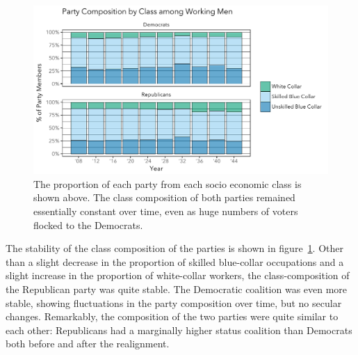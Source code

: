 \documentclass[11pt]{scrartcl}\usepackage[]{graphicx}\usepackage[]{color}
\makeatletter
\def\maxwidth{ %
  \ifdim\Gin@nat@width>\linewidth
    \linewidth
  \else
    \Gin@nat@width
  \fi
}
\newenvironment{knitrout}{}{} %
\makeatother
\begin{document}
\FloatBarrier
\begin{knitrout}
\color{fgcolor}\begin{figure}

{\centering \includegraphics[width=\maxwidth]{figures/plots-class_composition-1} 

}

\caption[The proportion of each party from each socio economic class is shown above]{The proportion of each party from each socio economic class is shown above. The class composition of both parties remained essentially constant over time, even as huge numbers of voters flocked to the Democrats.}\label{fig:class_composition}
\end{figure}


\end{knitrout}


The stability of the class composition of the parties is shown in figure~\ref{fig:class_composition}. Other than a slight decrease in the proportion of skilled blue-collar occupations and a slight increase in the proportion of white-collar workers, the class-composition of the Republican party was quite stable. The Democratic coalition was even more stable, showing fluctuations in the party composition over time, but no secular changes.  Remarkably, the composition of the two parties were quite similar to each other: Republicans had a marginally higher status coalition than Democrats both before and after the realignment. 
\end{document}
